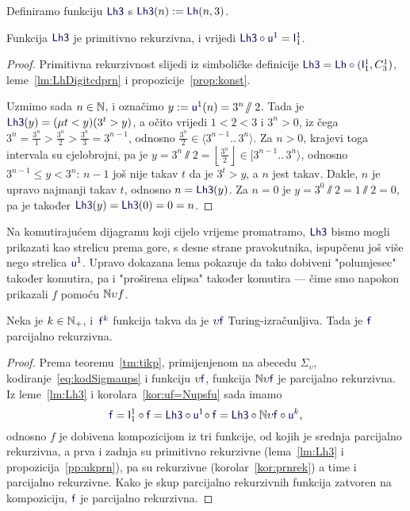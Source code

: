 \begin{lema}\label{lm:Lh3}
Definiramo funkciju $\f{Lh3}$ s $\f{Lh3}(n):=\f{Lh}(n,3)$. 

Funkcija $\f{Lh3}$ je primitivno rekurzivna, i vrijedi $\f{Lh3}\circ\f u^1=\f I_1^1$.
\end{lema}
\begin{proof}
Primitivna rekurzivnost slijedi iz simboličke definicije $\f{Lh3}=\f{Lh}\circ(\f I_1^1,C_3^1)$, leme~\ref{lm:LhDigitcdprn} i propozicije~\ref{prop:konst}.

Uzmimo sada $n\in{\mathbb N}$, i označimo $y:=\f u^1(n)=3^n\!\sslash2$. Tada je $\f{Lh3}(y)=(\mu t<y)(3^t>y)$, a očito vrijedi $1<2<3$ i $3^n>0$, iz čega $3^n=\frac{3^n}{1}>\frac{3^n}{2}>\frac{3^n}{3}=3^{n-1}$, odnosno $\frac{3^n}{2}\in\langle3^{n-1}..\,3^n\rangle$. Za $n>0$, krajevi toga intervala su cjelobrojni, pa je $y=3^n\!\sslash2=\left\lfloor\frac{3^n}{2}\right\rfloor\in[3^{n-1}..\,3^n\rangle$, odnosno $3^{n-1}\le y<3^n$: $n-1$ još nije takav $t$ da je $3^t>y$, a $n$ jest takav. Dakle, $n$ je upravo najmanji takav $t$, odnosno $n=\f{Lh3}(y)$. Za $n=0$ je $y=3^0\!\sslash2=1\sslash2=0$, pa je također $\f{Lh3}(y)=\f{Lh3}(0)=0=n$.
\end{proof}

Na komutirajućem dijagramu koji cijelo vrijeme promatramo, $\f{Lh3}$ bismo mogli prikazati kao strelicu prema gore, s desne strane pravokutnika, ispupčenu još više nego strelica $\f u^1$. Upravo dokazana lema pokazuje da tako dobiveni "polumjesec" također komutira, pa i "proširena elipsa" također komutira --- čime smo napokon prikazali $f$ pomoću ${\mathbb N}\upsilon f$.

\begin{teorem}\label{tm:utip}
Neka je $k\in{\mathbb N}_+$, i\, $\f f^k$ funkcija takva da je $\upsilon\f f$ Turing-izračunljiva. Tada je $\f f$ parcijalno rekurzivna.
\end{teorem}
\begin{proof}
Prema teoremu~\ref{tm:tikp}, primijenjenom na abecedu $\Sigma_\upsilon$, kodiranje~\eqref{eq:kodSigmaups} i funkciju $\upsilon\f f$, funkcija $\N\upsilon\f f$ je parcijalno rekurzivna. Iz leme~\ref{lm:Lh3} i korolara~\ref{kor:uf=Nupsfu} sada imamo
\begin{equation}
    \f f=\f I_1^1\circ\f f=\f{Lh3}\circ\f u^1\!\circ \f f=\f{Lh3}\circ\N\upsilon\f f\circ\f u^k\text,
\end{equation}
odnosno $f$ je dobivena kompozicijom iz tri funkcije, od kojih je srednja parcijalno rekurzivna, a prva i zadnja su primitivno rekurzivne (lema~\ref{lm:Lh3} i propozicija~\ref{pp:ukprn}), pa su rekurzivne (korolar~\ref{kor:prnrek}) a time i parcijalno rekurzivne. Kako je skup parcijalno rekurzivnih funkcija zatvoren na kompoziciju, $\f f$ je parcijalno rekurzivna.
\end{proof}

